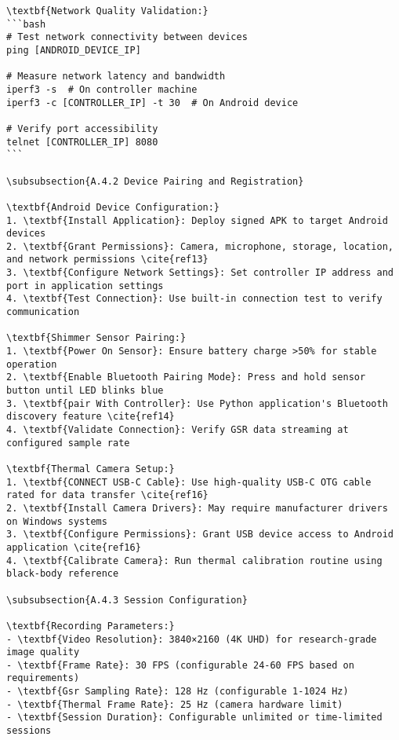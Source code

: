 \begin{verbatim}
\textbf{Network Quality Validation:}
```bash
# Test network connectivity between devices
ping [ANDROID_DEVICE_IP]

# Measure network latency and bandwidth
iperf3 -s  # On controller machine
iperf3 -c [CONTROLLER_IP] -t 30  # On Android device

# Verify port accessibility
telnet [CONTROLLER_IP] 8080
```

\subsubsection{A.4.2 Device Pairing and Registration}

\textbf{Android Device Configuration:}
1. \textbf{Install Application}: Deploy signed APK to target Android devices
2. \textbf{Grant Permissions}: Camera, microphone, storage, location, and network permissions \cite{ref13}
3. \textbf{Configure Network Settings}: Set controller IP address and port in application settings
4. \textbf{Test Connection}: Use built-in connection test to verify communication

\textbf{Shimmer Sensor Pairing:}
1. \textbf{Power On Sensor}: Ensure battery charge >50% for stable operation
2. \textbf{Enable Bluetooth Pairing Mode}: Press and hold sensor button until LED blinks blue
3. \textbf{pair With Controller}: Use Python application's Bluetooth discovery feature \cite{ref14}
4. \textbf{Validate Connection}: Verify GSR data streaming at configured sample rate

\textbf{Thermal Camera Setup:}
1. \textbf{CONNECT USB-C Cable}: Use high-quality USB-C OTG cable rated for data transfer \cite{ref16}
2. \textbf{Install Camera Drivers}: May require manufacturer drivers on Windows systems
3. \textbf{Configure Permissions}: Grant USB device access to Android application \cite{ref16}
4. \textbf{Calibrate Camera}: Run thermal calibration routine using black-body reference

\subsubsection{A.4.3 Session Configuration}

\textbf{Recording Parameters:}
- \textbf{Video Resolution}: 3840×2160 (4K UHD) for research-grade image quality
- \textbf{Frame Rate}: 30 FPS (configurable 24-60 FPS based on requirements)
- \textbf{Gsr Sampling Rate}: 128 Hz (configurable 1-1024 Hz)
- \textbf{Thermal Frame Rate}: 25 Hz (camera hardware limit)
- \textbf{Session Duration}: Configurable unlimited or time-limited sessions


\end{verbatim}
